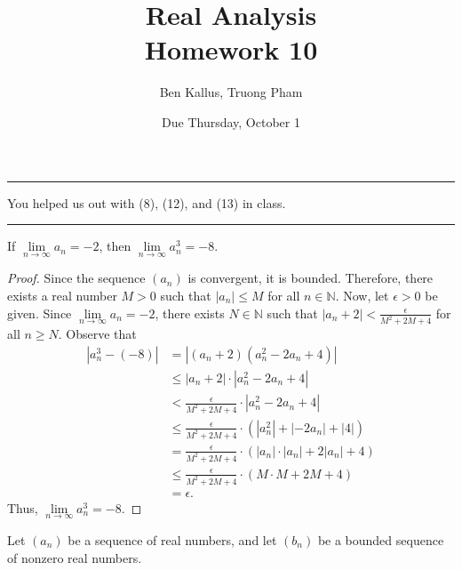\documentclass[12pt]{article}
\title{Real Analysis \\ Homework 10}
\author{Ben Kallus, Truong Pham}
\date{Due Thursday, October 1}
\begin{document}
\maketitle

\hrule
\bigskip

 You helped us out with (8), (12), and (13) in class.

\bigskip
\hrule
\bigskip

 If $\lim\limits_{n\to\infty}a_n=-2$, then $\lim\limits_{n\to\infty}a_n^3=-8$.
\begin{proof}
    Since the sequence $(a_n)$ is convergent, it is bounded. Therefore, there exists a real number $M > 0$ such that $|a_n| \leq M$ for all $n \in \mathbb N$. Now, let $\epsilon > 0$ be given. Since $\lim\limits_{n\to\infty} a_n = -2$, there exists $N \in \mathbb N$ such that $|a_n + 2| < \frac{\epsilon}{M^2+2M+4}$ for all $n \geq N$. Observe that
    \begin{align*}
        |a_n^3 - (-8)| &= |(a_n+2)(a_n^2-2a_n+4)| \\
                       &\leq |a_n + 2| \cdot |a_n^2 -2a_n + 4| \\
                       &< \frac{\epsilon}{M^2+2M+4} \cdot |a_n^2 -2a_n + 4| \\
                       &\leq \frac{\epsilon}{M^2+2M+4} \cdot (|a_n^2| + |-2a_n| + |4|) \\
                       &= \frac{\epsilon}{M^2+2M+4} \cdot (|a_n| \cdot |a_n| + 2|a_n| + 4) \\
                       &\leq \frac{\epsilon}{M^2+2M+4} \cdot (M \cdot M + 2M + 4) \\
                       &= \epsilon.
    \end{align*}
    Thus, $\lim\limits_{n\to\infty}a_n^3 = -8$.
\end{proof}
    
\newpage
{} Let $(a_n)$ be a sequence of real numbers, and let $(b_n)$ be a bounded sequence of nonzero real numbers.
\end{document}
